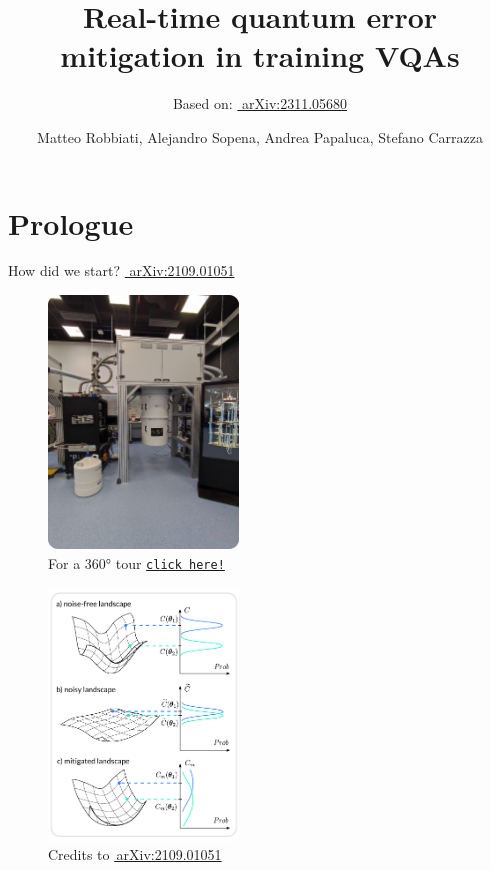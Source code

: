 \documentclass[8pt, xcolor={svgnames}, hyperref={linkcolor=black}]{beamer}
\title{Real-time quantum error mitigation in training VQAs}
\date{}
\author[Matteo Robbiati, Alejandro Sopena, Andrea Papaluca, Stefano Carrazza]{Matteo Robbiati, Alejandro Sopena, Andrea Papaluca, Stefano Carrazza}
\subtitle{Based on: \href{https://arxiv.org/abs/2311.05680}{\faBook\,\,arXiv:2311.05680}}
\begin{document}
\maketitle

\section{Prologue}


\begin{frame}{How did we start? \hfill \href{https://arxiv.org/abs/2109.01051}{\faBook\,\,arXiv:2109.01051}}
\pause
\begin{multicols}{2}
\begin{figure}
\includegraphics[width=0.45\textwidth, height=0.8\textheight]{figures/tii_lab.png}
\caption*{For a 360° tour \href{https://files-prod.tii.ae/360/TII-QRC-Computing-Lab.html}{\texttt{click here!}}}
\end{figure}
\pause
\begin{figure}
\includegraphics[width=0.45\textwidth, height=0.8\textheight]{figures/NIBP_cropped.pdf}
\caption*{Credits to \href{https://arxiv.org/abs/2109.01051}{\faBook\,arXiv:2109.01051}}
\end{figure}
\end{multicols}
\end{frame}
\end{document}
